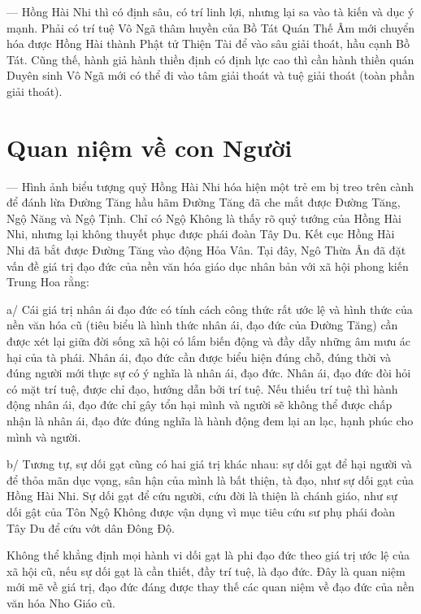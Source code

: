— Hồng Hài Nhi thì có định sâu, có trí linh lợi, nhưng lại sa vào tà kiến và dục ý mạnh. Phải có trí tuệ Vô Ngã thâm huyền của Bồ Tát Quán Thế Âm mới chuyển hóa được Hồng Hài thành Phật tử Thiện Tài để vào sâu giải thoát, hầu cạnh Bồ Tát. Cũng thế, hành giả hành thiền định có định lực cao thì cần hành thiền quán Duyên sinh Vô Ngã mới có thể đi vào tâm giải thoát và tuệ giải thoát (toàn phần giải thoát).

\section{Quan niệm về con Người} %
\label{sec:40_41_con_nguoi}

— Hình ảnh biểu tượng quỷ Hồng Hài Nhi hóa hiện một trẻ em bị treo trên cành để đánh lừa Đường Tăng hầu hãm Đường Tăng đã che mắt được Đường Tăng, Ngộ Năng và Ngộ Tịnh. Chỉ có Ngộ Không là thấy rõ quỷ tướng của Hồng Hài Nhi, nhưng lại không thuyết phục được phái đoàn Tây Du. Kết cục Hồng Hài Nhi đã bắt được Đường Tăng vào động Hỏa Vân. Tại đây, Ngô Thừa Ân đã đặt vấn đề giá trị đạo đức của nền văn hóa giáo dục nhân bản với xã hội phong kiến Trung Hoa rằng:

a/ Cái giá trị nhân ái đạo đức có tính cách công thức rất ước lệ và hình thức của nền văn hóa cũ (tiêu biểu là hình thức nhân ái, đạo đức của Đường Tăng) cần được xét lại giữa đời sống xã hội có lắm biến động và đầy dẫy những âm mưu ác hại của tà phái. Nhân ái, đạo đức cần được biểu hiện đúng chỗ, đúng thời và đúng người mới thực sự có ý nghĩa là nhân ái, đạo đức. Nhân ái, đạo đức đòi hỏi có mặt trí tuệ, được chỉ đạo, hướng dẫn bởi trí tuệ. Nếu thiếu trí tuệ thì hành động nhân ái, đạo đức chỉ gây tổn hại mình và người sẽ không thể được chấp nhận là nhân ái, đạo đức đúng nghĩa là hành động đem lại an lạc, hạnh phúc cho mình và người.

b/ Tương tự, sự dối gạt cũng có hai giá trị khác nhau: sự dối gạt để hại người và để thỏa mãn dục vọng, sân hận của mình là bất thiện, tà đạo, như sự dối gạt của Hồng Hài Nhi. Sự dối gạt để cứu người, cứu đời là thiện là chánh giáo, như sự dối gật của Tôn Ngộ Không được vận dụng vì mục tiêu cứu sư phụ phái đoàn Tây Du để cứu vớt dân Đông Độ.

Không thể khẳng định mọi hành vi dối gạt là phi đạo đức theo giá trị ước lệ của xã hội cũ, nếu sự dối gạt là cần thiết, đầy trí tuệ, là đạo đức. Đây là quan niệm mới mẽ về giá trị, đạo đức đáng được thay thế các quan niệm về đạo đức của nền văn hóa Nho Giáo cũ.


